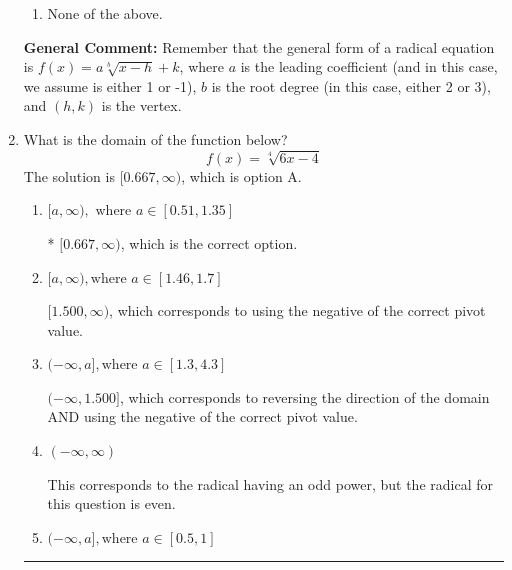 \documentclass{extbook}[14pt]
\newcommand{\litem}[1]{\item #1

\rule{\textwidth}{0.4pt}}
\begin{document}
\begin{enumerate}
{\begin{enumerate}[label=\Alph*.]
\item None of the above.\end{enumerate}
\textbf{General Comment:} Remember that the general form of a radical equation is $ f(x) = a \sqrt[b]{x - h} + k $, where $a$ is the leading coefficient (and in this case, we assume is either 1 or -1), $b$ is the root degree (in this case, either 2 or 3), and $(h, k)$ is the vertex.
}
\litem{
What is the domain of the function below?
\[ f(x) = \sqrt[4]{6 x - 4} \]The solution is \( [0.667, \infty) \), which is option A.\begin{enumerate}[label=\Alph*.]
\item \( [a, \infty), \text{ where } a \in [0.51, 1.35] \)

* $[0.667, \infty)$, which is the correct option.
\item \( [a, \infty), \text{where } a \in [1.46, 1.7] \)

$[1.500, \infty)$, which corresponds to using the negative of the correct pivot value.
\item \( (-\infty, a], \text{where } a \in [1.3, 4.3] \)

$(-\infty, 1.500]$, which corresponds to reversing the direction of the domain AND using the negative of the correct pivot value.
\item \( (-\infty, \infty) \)

This corresponds to the radical having an odd power, but the radical for this question is even.
\item \( (-\infty, a], \text{where } a \in [0.5, 1] \)


\end{enumerate}}
\end{enumerate}
\end{document}
